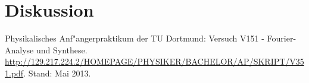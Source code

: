 \section{Diskussion}
\label{diskussion}

	

\begin{thebibliography}{9}
	 Physikalisches Anf"angerpraktikum der TU Dortmund: Versuch V151 - Fourier-Analyse und Synthese. \url{http://129.217.224.2/HOMEPAGE/PHYSIKER/BACHELOR/AP/SKRIPT/V351.pdf}. Stand: Mai 2013.
\end{thebibliography}
